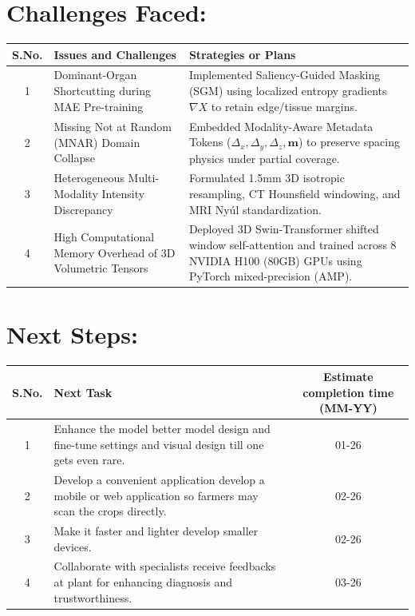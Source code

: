 \documentclass[11pt,a4paper]{article}
\begin{document}
\section{Challenges Faced:}
\begin{table}[h!]
\centering
\renewcommand{\arraystretch}{1.3}
\begin{tabularx}{\textwidth}{|c|X|X|}
\hline
\textbf{S.No.} & \textbf{Issues and Challenges} & \textbf{Strategies or Plans} \\ \hline
1 & Dominant-Organ Shortcutting during MAE Pre-training & Implemented Saliency-Guided Masking (SGM) using localized entropy gradients $\nabla X$ to retain edge/tissue margins. \\ \hline
2 & Missing Not at Random (MNAR) Domain Collapse & Embedded Modality-Aware Metadata Tokens ($\Delta_x, \Delta_y, \Delta_z, \mathbf{m}$) to preserve spacing physics under partial coverage. \\ \hline
3 & Heterogeneous Multi-Modality Intensity Discrepancy & Formulated 1.5mm 3D isotropic resampling, CT Hounsfield windowing, and MRI Nyúl standardization. \\ \hline
4 & High Computational Memory Overhead of 3D Volumetric Tensors & Deployed 3D Swin-Transformer shifted window self-attention and trained across 8 NVIDIA H100 (80GB) GPUs using PyTorch mixed-precision (AMP). \\ \hline
\end{tabularx}
\end{table}

\section{Next Steps:}
\begin{table}[h!]
\centering
\renewcommand{\arraystretch}{1.3}
\begin{tabularx}{\textwidth}{|c|X|c|}
\hline
\textbf{S.No.} & \textbf{Next Task} & \textbf{Estimate completion time (MM-YY)} \\ \hline
1 & Enhance the model better model design and fine-tune settings and visual design till one gets even rare. & 01-26 \\ \hline
2 & Develop a convenient application develop a mobile or web application so farmers may scan the crops directly. & 02-26 \\ \hline
3 & Make it faster and lighter develop smaller devices. & 02-26 \\ \hline
4 & Collaborate with specialists receive feedbacks at plant for enhancing diagnosis and trustworthiness. & 03-26 \\ \hline
\end{tabularx}
\end{table}
\end{document}
